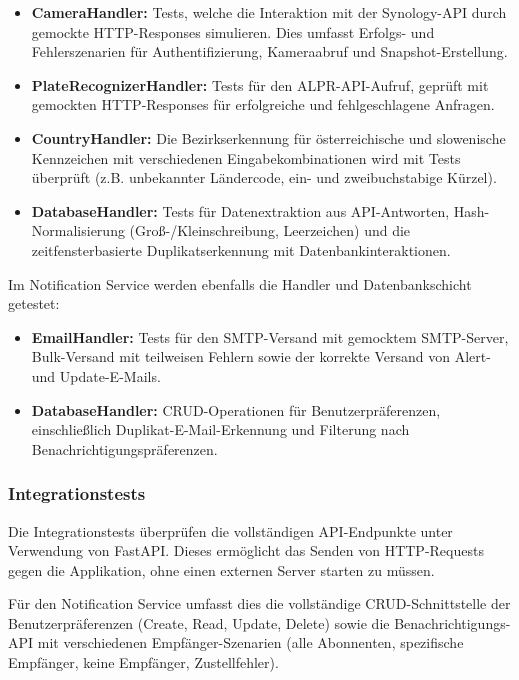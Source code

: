\begin{itemize}
    \item \textbf{CameraHandler:}
          Tests, welche die Interaktion mit der Synology-API durch gemockte HTTP-Responses simulieren.
          Dies umfasst Erfolgs- und Fehlerszenarien für Authentifizierung, Kameraabruf und Snapshot-Erstellung.

    \item \textbf{PlateRecognizerHandler:}
          Tests für den ALPR-API-Aufruf, geprüft mit gemockten HTTP-Responses für erfolgreiche und fehlgeschlagene Anfragen.

    \item \textbf{CountryHandler:}
          Die Bezirkserkennung für österreichische und slowenische Kennzeichen mit verschiedenen Eingabekombinationen wird mit Tests überprüft (z.B. unbekannter Ländercode, ein- und zweibuchstabige Kürzel).

    \item \textbf{DatabaseHandler:}
          Tests für Datenextraktion aus API-Antworten, Hash-Normalisierung (Groß-/Kleinschreibung, Leerzeichen) und die zeitfensterbasierte Duplikatserkennung mit Datenbankinteraktionen.
\end{itemize}

\newpage
Im Notification Service werden ebenfalls die Handler und Datenbankschicht getestet:

\begin{itemize}
    \item \textbf{EmailHandler:}
          Tests für den SMTP-Versand mit gemocktem SMTP-Server, Bulk-Versand mit teilweisen Fehlern sowie der korrekte Versand von Alert- und Update-E-Mails.

    \item \textbf{DatabaseHandler:}
          CRUD-Operationen für Benutzerpräferenzen, einschließlich Duplikat-E-Mail-Erkennung und Filterung nach Benachrichtigungspräferenzen.
\end{itemize}


\subsubsection{Integrationstests}

Die Integrationstests überprüfen die vollständigen API-Endpunkte unter Verwendung von FastAPI.
Dieses ermöglicht das Senden von HTTP-Requests gegen die Applikation, ohne einen externen Server starten zu müssen.

Für den Notification Service umfasst dies die vollständige CRUD-Schnittstelle der Benutzerpräferenzen (Create, Read, Update, Delete) sowie die Benachrichtigungs-API mit verschiedenen Empfänger-Szenarien (alle Abonnenten, spezifische Empfänger, keine Empfänger, Zustellfehler).


